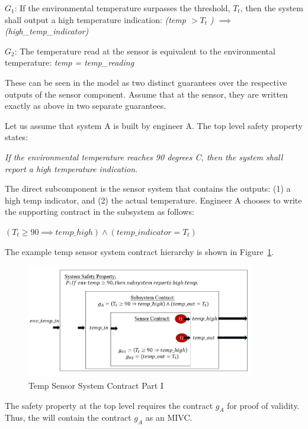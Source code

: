 $G_1$: If the environmental temperature surpasses the threshold, $T_t$, then the system shall output a high temperature indication: \textit{(temp $> T_t$ ) $\implies$ (high\_temp\_indicator)}

$G_2$: The temperature read at the sensor is equivalent to the environmental temperature: \textit{temp = temp\_reading} 

These can be seen in the model as two distinct guarantees over the respective outputs of the sensor component. Assume that at the sensor, they are written exactly as above in two separate guarantees. 

Let us assume that system A is built by engineer A. The top level safety property states: 
\begin{center}
    \textit{If the environmental temperature reaches 90 degrees C, then the system shall report a high temperature indication.}
\end{center}

The direct subcomponent is the sensor system that contains the outputs: (1) a high temp indicator, and (2) the actual temperature. Engineer A chooses to write the supporting contract in the subsystem as follows: 
\begin{center}
    $(T_t \geq 90 \implies temp\_high) \land (temp\_indicator = T_t)$ 
\end{center}
  
The example temp sensor system contract hierarchy is shown in Figure~\ref{fig:granularityEx1}.  

\begin{figure}[h!]
\begin{center}
\includegraphics[width=10cm]{images/granEx1.jpg}
\caption{Temp Sensor System Contract Part I} \label{fig:granularityEx1}
\end{center}
\end{figure}

The safety property at the top level requires the contract $g_A$ for proof of validity. Thus, the \aivcalg will contain the contract $g_A$ as an MIVC. 

